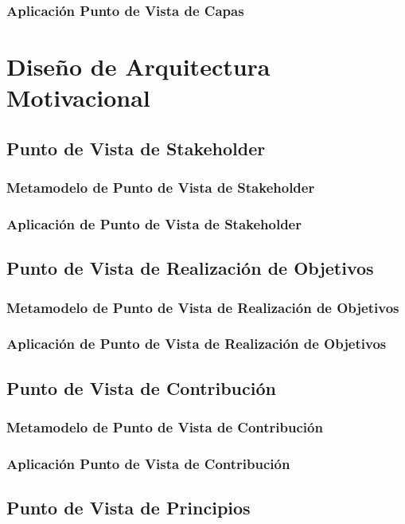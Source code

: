       \subsubsection{Aplicación Punto de Vista de Capas}
     \section{Diseño de Arquitectura Motivacional}
      \subsection{Punto de Vista de Stakeholder}
      \subsubsection{Metamodelo de Punto de Vista de Stakeholder}
      \subsubsection{Aplicación de Punto de Vista de Stakeholder}
      \subsection{Punto de Vista de Realización de Objetivos}
      \subsubsection{Metamodelo de Punto de Vista de Realización de Objetivos}
      \subsubsection{Aplicación de Punto de Vista de Realización de Objetivos}
      \subsection{Punto de Vista de Contribución}
      \subsubsection{Metamodelo de Punto de Vista de Contribución}
      \subsubsection{Aplicación Punto de Vista de Contribución}
      \subsection{Punto de Vista de Principios}

